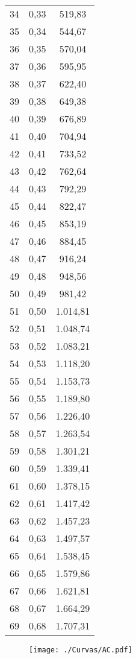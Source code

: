\documentclass[]{article}
\begin{document}
\begin{longtable}[t]{ccc}
34 & 0,33 & 519,83\\
35 & 0,34 & 544,67\\
36 & 0,35 & 570,04\\
37 & 0,36 & 595,95\\
38 & 0,37 & 622,40\\
39 & 0,38 & 649,38\\
40 & 0,39 & 676,89\\
41 & 0,40 & 704,94\\
42 & 0,41 & 733,52\\
43 & 0,42 & 762,64\\
44 & 0,43 & 792,29\\
45 & 0,44 & 822,47\\
46 & 0,45 & 853,19\\
47 & 0,46 & 884,45\\
48 & 0,47 & 916,24\\
49 & 0,48 & 948,56\\
50 & 0,49 & 981,42\\
51 & 0,50 & 1.014,81\\
52 & 0,51 & 1.048,74\\
53 & 0,52 & 1.083,21\\
54 & 0,53 & 1.118,20\\
55 & 0,54 & 1.153,73\\
56 & 0,55 & 1.189,80\\
57 & 0,56 & 1.226,40\\
58 & 0,57 & 1.263,54\\
59 & 0,58 & 1.301,21\\
60 & 0,59 & 1.339,41\\
61 & 0,60 & 1.378,15\\
62 & 0,61 & 1.417,42\\
63 & 0,62 & 1.457,23\\
64 & 0,63 & 1.497,57\\
65 & 0,64 & 1.538,45\\
66 & 0,65 & 1.579,86\\
67 & 0,66 & 1.621,81\\
68 & 0,67 & 1.664,29\\
69 & 0,68 & 1.707,31\\*
\end{longtable}

\clearpage

\begin{sidewaysfigure}[htb]
   \centering
   \texttt{[image: ./Curvas/AC.pdf]}
\end{sidewaysfigure}
\end{document}
